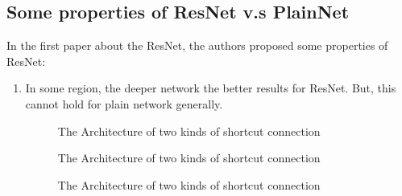 \subsection{Some properties of ResNet v.s PlainNet}
In the first paper about the ResNet, the authors proposed some properties of ResNet:
\begin{enumerate}
\item In some region, the deeper network the better results for ResNet. But, this cannot hold for plain network generally. 
\begin{figure}[!htb]
	\caption{The Architecture of two kinds of shortcut connection}      
	\label{LeNet-5}
\end{figure}

\begin{figure}[!htb]
	\caption{The Architecture of two kinds of shortcut connection}      
	\label{LeNet-5}
\end{figure}

\begin{figure}[!htb]
	\caption{The Architecture of two kinds of shortcut connection}      
	\label{LeNet-5}
\end{figure}



\end{enumerate}

